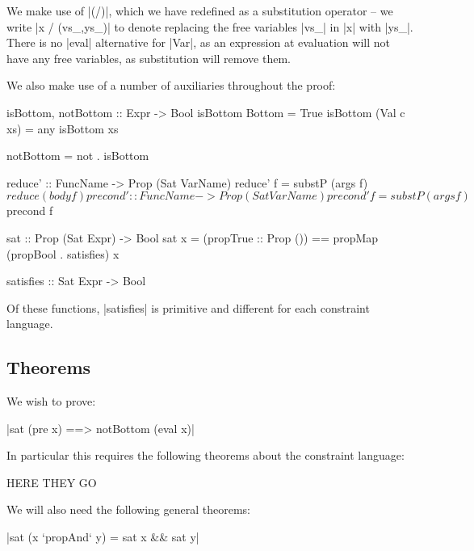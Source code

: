 We make use of |(/)|, which we have redefined as a substitution operator -- we write |x / (vs_,ys_)| to denote replacing the free variables |vs_| in |x| with |ys_|. There is no |eval| alternative for |Var|, as an expression at evaluation will not have any free variables, as substitution will remove them.

We also make use of a number of auxiliaries throughout the proof:

\begin{code}
isBottom, notBottom :: Expr -> Bool
isBottom Bottom = True
isBottom (Val c xs) = any isBottom xs

notBottom = not . isBottom

reduce' :: FuncName -> Prop (Sat VarName)
reduce' f = substP (args f) $ reduce (body f)

precond' :: FuncName -> Prop (Sat VarName)
precond' f = substP (args f) $ precond f

sat :: Prop (Sat Expr) -> Bool
sat x = (propTrue :: Prop ()) == propMap (propBool . satisfies) x

satisfies :: Sat Expr -> Bool
\end{code}

Of these functions, |satisfies| is primitive and different for each constraint language.


\subsection{Theorems}

We wish to prove:

{|sat (pre x) ==> notBottom (eval x)|}

In particular this requires the following theorems about the constraint language:

HERE THEY GO

We will also need the following general theorems:

{|sat (x `propAnd` y) = sat x && sat y|}


%
%
%
%
%
%
%
%


